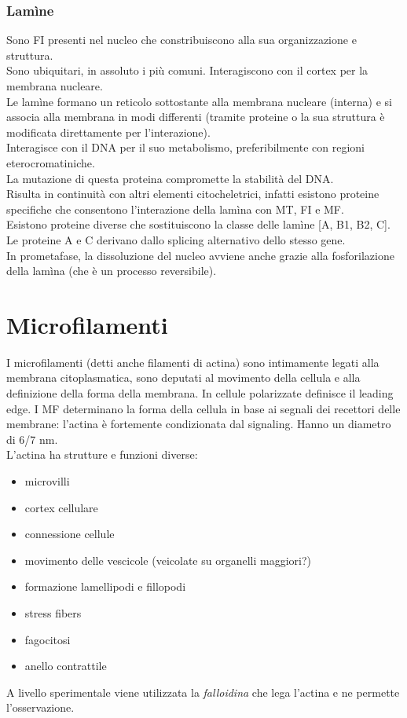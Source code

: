         \subsubsection{Lamìne}
            Sono FI presenti nel nucleo che constribuiscono alla sua organizzazione e struttura.\\
            Sono ubiquitari, in assoluto i più comuni. Interagiscono con il cortex per la membrana nucleare. \\
            Le lamìne formano un reticolo sottostante alla membrana nucleare (interna) e si associa alla membrana in modi differenti (tramite proteine o la sua struttura è modificata direttamente per l'interazione). \\
            Interagisce con il DNA per il suo metabolismo, preferibilmente con regioni eterocromatiniche.\\
            La mutazione di questa proteina compromette la stabilità del DNA.\\
            Risulta in continuità con altri elementi citocheletrici, infatti esistono proteine specifiche che consentono l'interazione della lamìna con MT, FI e MF.\\
            Esistono proteine diverse che sostituiscono la classe delle lamìne [A, B1, B2, C]. Le proteine A e C derivano dallo splicing alternativo dello stesso gene.\\
            In prometafase, la dissoluzione del nucleo avviene anche grazie alla fosforilazione della lamìna (che è un processo reversibile).

\section{Microfilamenti}
    I microfilamenti (detti anche filamenti di actina) sono intimamente legati alla membrana citoplasmatica, sono deputati al movimento della cellula e alla definizione della forma della membrana. In cellule polarizzate definisce il leading edge. I MF determinano la forma della cellula in base ai segnali dei recettori delle membrane: l'actina è fortemente condizionata dal signaling. Hanno un diametro di 6/7 nm.\\
    L'actina ha strutture e funzioni diverse:

        \begin{itemize}
            \item microvilli
            \item cortex cellulare
            \item connessione cellule
            \item movimento delle vescicole (veicolate su organelli maggiori?)
            \item formazione lamellipodi e fillopodi
            \item stress fibers
            \item fagocitosi
            \item anello contrattile
        \end{itemize}
    A livello sperimentale viene utilizzata la \textit{falloidina} che lega l'actina e ne permette l'osservazione.
    
